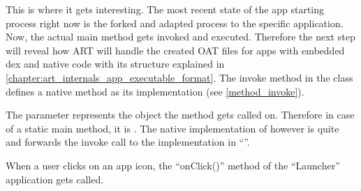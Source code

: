 This is where it gets interesting. The most recent state of the app starting process
right now is the forked and adapted process to the specific application. Now, the actual main
method gets invoked and executed. Therefore the next step will reveal how ART will handle the
created OAT files for apps with embedded dex and native code with its structure explained in \autoref{chapter:art_internals_app_executable_format}. The invoke method in the  class defines a native method as its implementation (see \autoref{method_invoke}).

The  parameter represents the object the method gets called on. Therefore
in case of a static main method, it is . The native implementation of 
however is quite and forwards the invoke call to the  implementation in
``''. 





When a user clicks on an app icon, the ``onClick()'' method
of the ``Launcher'' application gets called.




